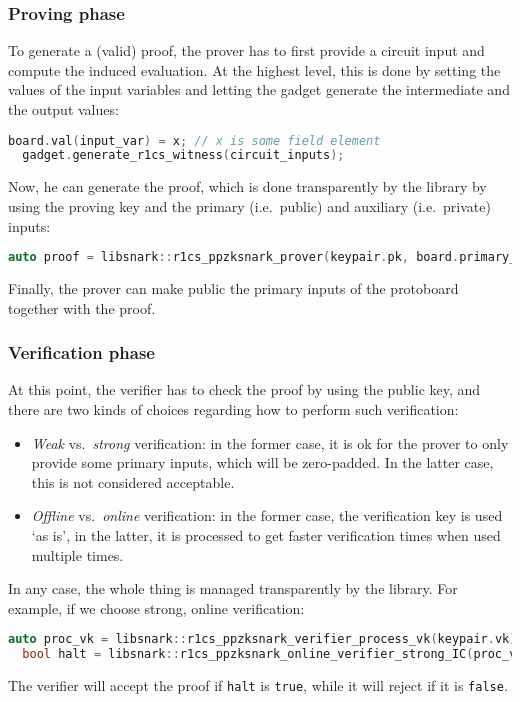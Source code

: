 \subsubsection*{Proving phase}
To generate a (valid) proof, the prover has to first provide a circuit input and compute the 
induced evaluation. 
At the highest level, this is done by setting the values of the input variables and letting the 
gadget generate the intermediate and the output values:
\begin{lstlisting}[language=C++]
  board.val(input_var) = x; // x is some field element
  gadget.generate_r1cs_witness(circuit_inputs);
\end{lstlisting}
Now, he can generate the proof, which is done transparently by the library by using the 
proving key and the primary (i.e.\ public) and auxiliary (i.e.\ private) inputs:
\begin{lstlisting}[language=C++]
  auto proof = libsnark::r1cs_ppzksnark_prover(keypair.pk, board.primary_input(), board.auxiliary_input());
\end{lstlisting}
Finally, the prover can make public the primary inputs of the protoboard together with the
proof.

\subsubsection*{Verification phase}
At this point, the verifier has to check the proof by using the public key, and there are two 
kinds of choices regarding how to perform such verification: 
\begin{itemize}
  \item \emph{Weak} vs.\  \emph{strong} verification: in the former case, it is ok for the prover 
        to only provide some primary inputs, which will be zero-padded. 
        In the latter case, this is not considered acceptable.
  \item \emph{Offline} vs.\  \emph{online} verification: in the former case, the verification key 
        is used `as is', in the latter, it is processed to get faster verification times when used 
        multiple times.
\end{itemize}
In any case, the whole thing is managed transparently by the library.
For example, if we choose strong, online verification:
\begin{lstlisting}[language=C++]
  auto proc_vk = libsnark::r1cs_ppzksnark_verifier_process_vk(keypair.vk);
  bool halt = libsnark::r1cs_ppzksnark_online_verifier_strong_IC(proc_vk, board.primary_input(), proof);
\end{lstlisting}
The verifier will accept the proof if \texttt{halt} is \texttt{true}, while it will reject if it 
is \texttt{false}.

